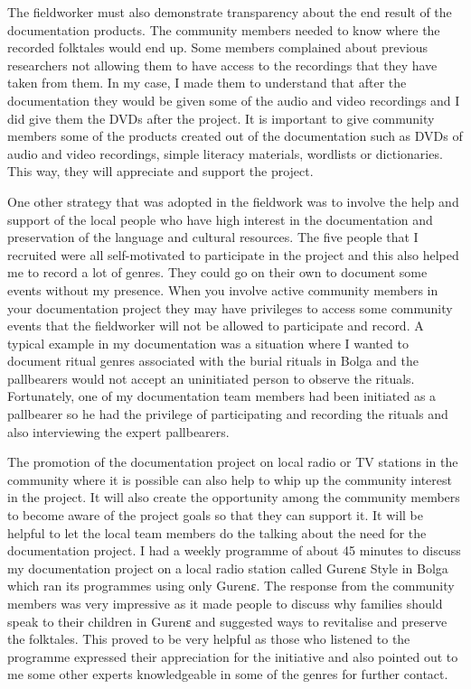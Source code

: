 \documentclass[output=paper,colorlinks,citecolor=brown]{langscibook}
\begin{document}
The fieldworker must also demonstrate transparency about the end result of the documentation products. The community members needed to know where the recorded folktales would end up. Some members complained about previous researchers not allowing them to have access to the recordings that they have taken from them. In my case, I made them to understand that after the documentation they would be given some of the audio and video recordings and I did give them the DVDs after the project. It is important to give community members some of the products created out of the documentation such as DVDs of audio and video recordings, simple literacy materials, wordlists or dictionaries. This way, they will appreciate and support the project.

One other strategy that was adopted in the fieldwork was to involve the help and support of the local people who have high interest in the documentation and preservation of the language and cultural resources. The five people that I recruited were all self-motivated to participate in the project and this also helped me to record a lot of genres. They could go on their own to document some events without my presence. When you involve active community members in your documentation project they may have privileges to access some community events that the fieldworker will not be allowed to participate and record.  A typical example in my documentation was a situation where I wanted to document ritual genres associated with the burial rituals in Bolga and the pallbearers would not accept an uninitiated person to observe the rituals. Fortunately, one of my documentation team members had been initiated as a pallbearer so he had the privilege of participating and recording the rituals and also interviewing the expert pallbearers.

The promotion of the documentation project on local radio or TV stations in the community where it is possible can also help to whip up the community interest in the project. It will also create the opportunity among the community members to become aware of the project goals so that they can support it. It will be helpful to let the local team members do the talking about the need for the documentation project. I had a weekly programme of about 45 minutes to discuss my documentation project on a local radio station called Gurenɛ Style in Bolga which ran its programmes using only Gurenɛ. The response from the community members was very impressive as it made people to discuss why families should speak to their children in Gurenɛ and suggested ways to revitalise and preserve the folktales.  This proved to be very helpful as those who listened to the programme expressed their appreciation for the initiative and also pointed out to me some other experts knowledgeable in some of the genres for further contact. 
\end{document}
